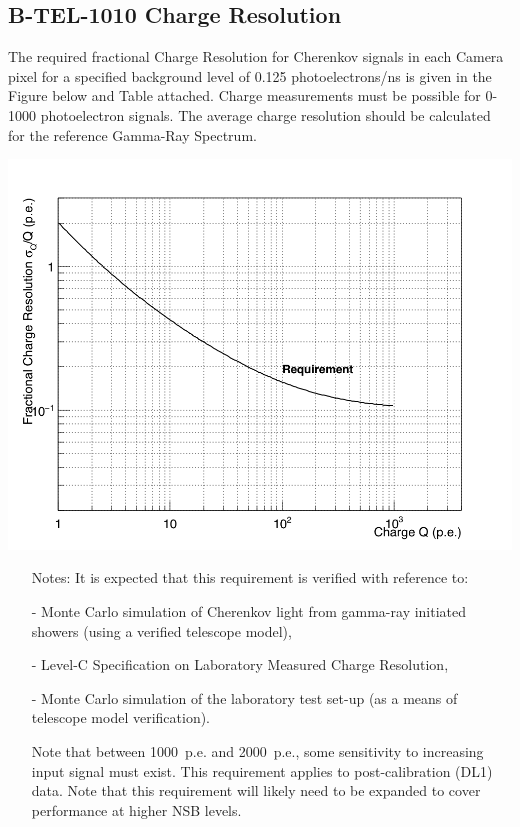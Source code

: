 \begin{requirement}{\subsection{B-TEL-1010 Charge Resolution}}
	The required fractional Charge Resolution for Cherenkov signals in each Camera pixel for a specified background level of 0.125 photoelectrons/ns is given in the Figure below and Table attached. Charge measurements must be possible for 0-1000 photoelectron signals. The average charge resolution should be calculated for the reference Gamma-Ray Spectrum.
    
	\centering\includegraphics[width=0.8\linewidth]{figures/images/charge_res_req}
	\label{fig:charge_res_req}
    
\begin{itemize}
\item [Notes:] It is expected that this requirement is verified with reference to:

- Monte Carlo simulation of Cherenkov light from gamma-ray initiated showers (using a verified telescope model),

- Level-C Specification on Laboratory Measured Charge Resolution,

- Monte Carlo simulation of the laboratory test set-up (as a means of telescope model verification).

Note that between 1000~p.e. and 2000~p.e., some sensitivity to increasing input signal must exist. \newline
This requirement applies to post-calibration (DL1) data. \newline
Note that this requirement will likely need to be expanded to cover performance at higher NSB levels.
\end{itemize}
\end{requirement}

